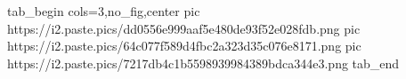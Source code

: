  
 
 
 
 


\ifcmt
  tab_begin cols=3,no_fig,center
     pic https://i2.paste.pics/dd0556e999aaf5e480de93f52e028fdb.png
		 pic https://i2.paste.pics/64c077f589d4fbc2a323d35c076e8171.png
		 pic https://i2.paste.pics/7217db4c1b5598939984389bdca344e3.png
  tab_end
\fi
